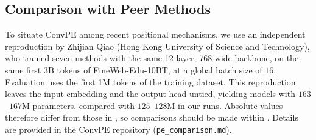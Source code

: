 \documentclass{article}
\begin{document}
\subsection{Comparison with Peer Methods}
\label{sec:peer}

To situate ConvPE among recent positional mechanisms, we use an independent reproduction by Zhijian Qiao (Hong Kong University of Science and Technology), who trained seven methods with the same 12-layer, 768-wide backbone, on the same first 3B tokens of FineWeb-Edu-10BT, at a global batch size of $16$. Evaluation uses the first 1M tokens of the training dataset. This reproduction leaves the input embedding and the output head untied, yielding models with $163$--$167$M parameters, compared with $125$--$128$M in our runs. Absolute values therefore differ from those in , so comparisons should be made within . Details are provided in the ConvPE repository (\texttt{pe\_comparison.md}).
\end{document}
